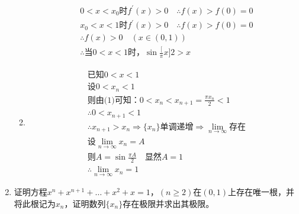 \begin{enumerate}[{例}1.]
\begin{enumerate}[(1)]
\begin{align*}
                    &0<x<x_0\mbox{时}f^{\prime}(x)>0\quad\therefore f(x)>f(0)=0\\
                    &x_0<x<1\mbox{时}f^{\prime}(x)>0\quad\therefore f(x)>f(0)=0\\
                    &\therefore f(x)>0\quad(x\in(0,1))\\
                    &\therefore\mbox{当}0<x<1\mbox{时，}\sin\frac[\pi x]{2}>x
                \end{align*}
            \item
                \begin{align*}
                    &\mbox{已知}0<x<1\\
                    &\mbox{设}0<x_n<1\\
                    &\mbox{则由(1)可知：}0<x_n<x_{n+1}=\frac{\pi x_n}{2}<1\\
                    &\therefore 0<x_{n+1}<1\\
                    &\therefore x_{n+1}>x_n\Rightarrow\{x_n\}\mbox{单调递增}\Rightarrow\lim_{n\to\infty}\mbox{存在}\\
                    &\mbox{设}\lim_{n\to\infty}x_n=A\\
                    &\mbox{则}A=\sin\frac{\pi A}{2}\quad\mbox{显然}A=1\\
                    &\therefore\lim_{n\to\infty}x_n=1
                \end{align*}
        \end{enumerate}
    \item 证明方程$x^n+x^{n+1}+\dots+x^2+x=1$，$(n\geq 2)$在$(0,1)$上存在唯一根，并将此根记为$x_n$，证明数列$\{x_n\}$存在极限并求出其极限。


\end{enumerate}
